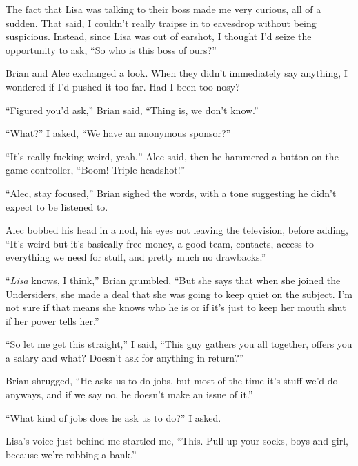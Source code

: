 The fact that Lisa was talking to their boss made me very curious, all of a sudden.  That said, I couldn't really traipse in to eavesdrop without being suspicious.  Instead, since Lisa was out of earshot, I thought I'd seize the opportunity to ask, ``So who is this boss of ours?''



Brian and Alec exchanged a look.  When they didn't immediately say anything, I wondered if I'd pushed it too far.  Had I been too nosy?



``Figured you'd ask,'' Brian said, ``Thing is, we don't know.''



``What?'' I asked, ``We have an anonymous sponsor?''



``It's really fucking weird, yeah,'' Alec said, then he hammered a button on the game controller, ``Boom!  Triple headshot!''



``Alec, stay focused,'' Brian sighed the words, with a tone suggesting he didn't expect to be listened to.



Alec bobbed his head in a nod, his eyes not leaving the television, before adding, ``It's weird but it's basically free money, a good team, contacts, access to everything we need for stuff, and pretty much no drawbacks.''



``\emph{Lisa} knows, I think,'' Brian grumbled, ``But she says that when she joined the Undersiders, she made a deal that she was going to keep quiet on the subject.  I'm not sure if that means she knows who he is or if it's just to keep her mouth shut if her power tells her.''



``So let me get this straight,'' I said, ``This guy gathers you all together, offers you a salary and what?  Doesn't ask for anything in return?''



Brian shrugged, ``He asks us to do jobs, but most of the time it's stuff we'd do anyways, and if we say no, he doesn't make an issue of it.''



``What kind of jobs does he ask us to do?'' I asked.



Lisa's voice just behind me startled me, ``This.  Pull up your socks, boys and girl, because we're robbing a bank.''





